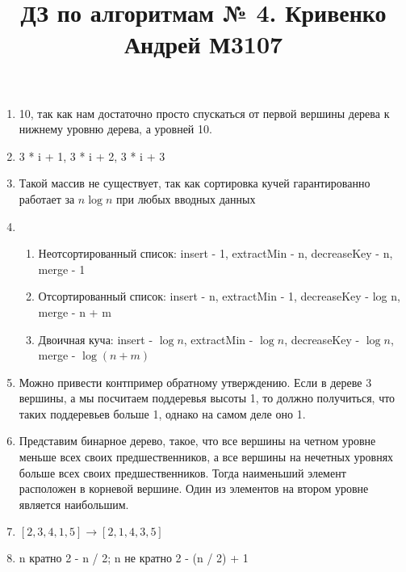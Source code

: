\documentclass{article}
\title{ДЗ по алгоритмам № 4. Кривенко Андрей М3107}
\begin{document}
\maketitle
\begin{enumerate}  
  \item 10, так как нам достаточно просто спускаться от первой вершины дерева к нижнему уровню дерева, а уровней 10.
  \item 3 * i + 1, 3 * i + 2, 3 * i + 3
  \item Такой массив не существует, так как сортировка кучей гарантированно работает за $n \log n$ при любых вводных данных
  \item \begin{enumerate}
      \item Неотсортированный список: insert - 1, extractMin - n, decreaseKey - n, merge - 1
      \item Отсортированный список: insert - n, extractMin - 1, decreaseKey - log n, merge - n + m
      \item Двоичная куча: insert - $\log n$,  extractMin - $\log n$, decreaseKey - $\log n$, merge - $\log (n + m)$
    \end{enumerate}
  \item Можно привести контпример обратному утверждению. Если в дереве 3 вершины, а мы посчитаем поддеревья высоты 1, то должно получиться, что таких поддеревьев больше 1, однако на самом деле оно 1.
  \item Представим бинарное дерево, такое, что все вершины на четном уровне меньше всех своих предшественников, а все вершины на нечетных уровнях больше всех своих предшественников.
    Тогда наименьший элемент расположен в корневой вершине. Один из элементов на втором уровне является наибольшим.
  \item $[2, 3, 4, 1, 5] \to  [2, 1, 4, 3, 5]$
  \item n кратно 2 - n / 2; n не кратно 2 - (n / 2) + 1
  \end{enumerate}
\end{document}
